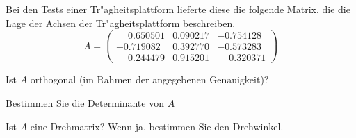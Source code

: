 Bei den Tests einer Tr"agheitsplattform lieferte diese die folgende Matrix,
die die Lage der Achsen der Tr"agheitsplattform beschreiben.
\[
A=\begin{pmatrix}
\phantom{-}0.650501&0.090217&          -0.754128\\
  -0.719082&0.392770&          -0.573283\\
\phantom{-}0.244479&0.915201&\phantom{-}0.320371
\end{pmatrix}
\]
\begin{teilaufgaben}
\item Ist $A$ orthogonal (im Rahmen der angegebenen Genauigkeit)?
\item Bestimmen Sie die Determinante von $A$
\item Ist $A$ eine Drehmatrix? Wenn ja, bestimmen Sie den Drehwinkel.
\end{teilaufgaben}

